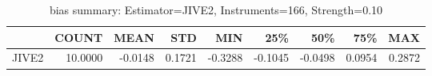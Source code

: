 \begin{table}[ht]
\centering
\caption{bias summary: Estimator=JIVE2, Instruments=166, Strength=0.10}
\begin{tabular}{lrrrrrrrr}
\toprule
 & COUNT & MEAN & STD & MIN & 25\% & 50\% & 75\% & MAX \\
\midrule
JIVE2 & 10.0000 & -0.0148 & 0.1721 & -0.3288 & -0.1045 & -0.0498 & 0.0954 & 0.2872 \\
\bottomrule
\end{tabular}
\end{table}
